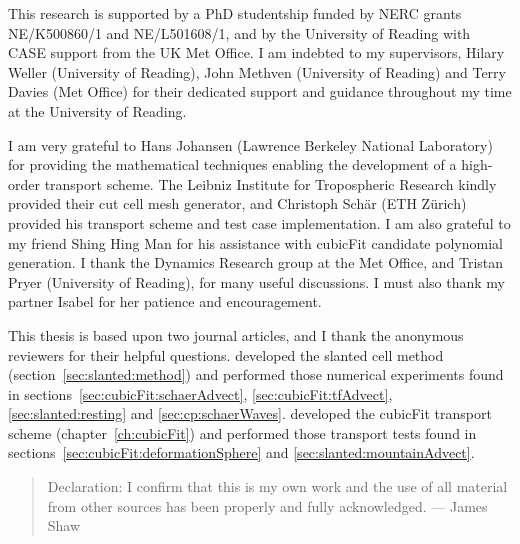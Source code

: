 \null\vfil
\begin{acknowledgements}
This research is supported by a PhD studentship funded by NERC grants NE/K500860/1 and NE/L501608/1, and by the University of Reading with CASE support from the UK Met Office.  I am indebted to my supervisors, Hilary Weller (University of Reading), John Methven (University of Reading) and Terry Davies (Met Office) for their dedicated support and guidance throughout my time at the University of Reading.

I am very grateful to Hans Johansen (Lawrence Berkeley National Laboratory) for providing the mathematical techniques enabling the development of a high-order transport scheme.  The Leibniz Institute for Tropospheric Research kindly provided their cut cell mesh generator, and Christoph Sch\"{a}r (ETH Z\"{u}rich) provided his transport scheme and test case implementation.
I am also grateful to my friend Shing Hing Man for his assistance with cubicFit candidate polynomial generation.  I thank the Dynamics Research group at the Met Office, and Tristan Pryer (University of Reading), for many useful discussions.
I must also thank my partner Isabel for her patience and encouragement.
	
This thesis is based upon two journal articles, and I thank the anonymous reviewers for their helpful questions. \citet{shaw-weller2016} developed the slanted cell method (section~\ref{sec:slanted:method}) and performed those numerical experiments found in sections~\ref{sec:cubicFit:schaerAdvect}, \ref{sec:cubicFit:tfAdvect}, \ref{sec:slanted:resting} and \ref{sec:cp:schaerWaves}.
\citet{shaw2017} developed the cubicFit transport scheme (chapter~\ref{ch:cubicFit}) and performed those transport tests found in sections~\ref{sec:cubicFit:deformationSphere} and \ref{sec:slanted:mountainAdvect}.

\vspace*{4em}


\end{acknowledgements}
\vfil
\begin{quote}{\small Declaration: I confirm that this is my own work and the use of all material from other sources has been properly and fully acknowledged. --- James Shaw}
\end{quote}

